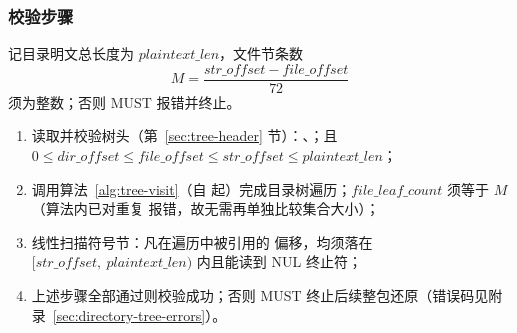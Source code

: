 \subsubsection*{校验步骤}

记目录明文总长度为 $\mathit{plaintext\_len}$，文件节条数
\[
  M = \frac{\mathit{str\_offset} - \mathit{file\_offset}}{72}
\]
须为整数；否则 MUST 报错并终止。

\begin{enumerate}
  \item 读取并校验树头（第~\ref{sec:tree-header} 节）：、；且 $0 \le \mathit{dir\_offset} \le \mathit{file\_offset} \le \mathit{str\_offset} \le \mathit{plaintext\_len}$；
  \item 调用算法~\ref{alg:tree-visit}（自  起）完成目录树遍历；$\mathit{file\_leaf\_count}$ 须等于 $M$（算法内已对重复  报错，故无需再单独比较集合大小）；
  \item 线性扫描符号节：凡在遍历中被引用的  偏移，均须落在 $[\mathit{str\_offset},\ \mathit{plaintext\_len})$ 内且能读到 NUL 终止符；
  \item 上述步骤全部通过则校验成功；否则 MUST 终止后续整包还原（错误码见附录~\ref{sec:directory-tree-errors}）。
\end{enumerate}
